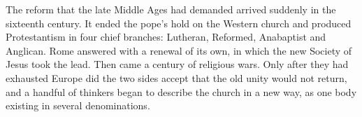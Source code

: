 \begin{partoverview}
The reform that the late Middle Ages had demanded arrived suddenly in the sixteenth century. It ended
the pope's hold on the Western church and produced Protestantism in four chief branches: Lutheran,
Reformed, Anabaptist and Anglican. Rome answered with a renewal of its own, in which the new Society of
Jesus took the lead. Then came a century of religious wars. Only after they had exhausted Europe did the
two sides accept that the old unity would not return, and a handful of thinkers began to describe the
church in a new way, as one body existing in several denominations.
\end{partoverview}

